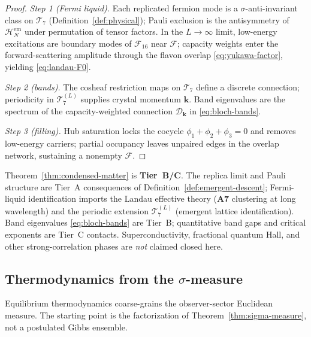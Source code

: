 \begin{proof}
\emph{Step 1 (Fermi liquid).}
Each replicated fermion mode is a $\sigma$-anti-invariant class on
$\mathcal{T}_7$ (Definition~\ref{def:physical}); Pauli exclusion is the
antisymmetry of $\mathcal{H}_N^{\mathrm{em}}$ under permutation of tensor
factors. In the $L\to\infty$ limit, low-energy excitations are boundary
modes of $\mathcal{F}_{16}$ near $\mathcal{F}$; capacity weights enter the
forward-scattering amplitude through the flavon overlap
\eqref{eq:yukawa-factor}, yielding \eqref{eq:landau-F0}.

\emph{Step 2 (bands).}
The cosheaf restriction maps on $\mathcal{T}_7$ define a discrete
connection; periodicity in $\mathcal{T}_7^{(L)}$ supplies crystal momentum
$\mathbf{k}$. Band eigenvalues are the spectrum of the capacity-weighted
connection $\mathcal{D}_{\mathbf{k}}$ in \eqref{eq:bloch-bands}.

\emph{Step 3 (filling).}
Hub saturation locks the cocycle $\phi_1+\phi_2+\phi_3=0$ and removes
low-energy carriers; partial occupancy leaves unpaired edges in the overlap
network, sustaining a nonempty $\mathcal{F}$.
\end{proof}

\begin{remark}
Theorem~\ref{thm:condensed-matter} is \textbf{Tier~B/C}. The replica limit
and Pauli structure are Tier~A consequences of
Definition~\ref{def:emergent-descent}; Fermi-liquid identification imports
the Landau effective theory (\textbf{A7} clustering at long wavelength) and
the periodic extension $\mathcal{T}_7^{(L)}$ (emergent lattice identification).
Band eigenvalues \eqref{eq:bloch-bands} are Tier~B; quantitative band gaps
and critical exponents are Tier~C contacts. Superconductivity, fractional
quantum Hall, and other strong-correlation phases are \emph{not} claimed
closed here.
\end{remark}

\subsection{Thermodynamics from the \texorpdfstring{$\sigma$}{sigma}-measure}
\label{sec:emergent:thermo}

Equilibrium thermodynamics coarse-grains the observer-sector Euclidean
measure. The starting point is the factorization of
Theorem~\ref{thm:sigma-measure}, not a postulated Gibbs ensemble.

